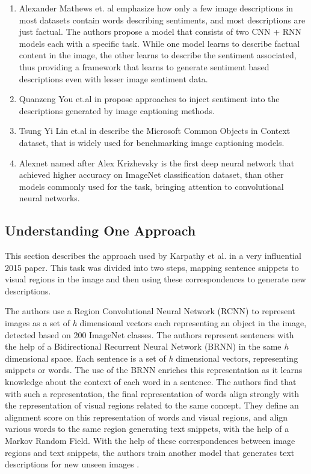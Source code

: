 \documentclass[a4paper]{article}
\begin{document}
\begin{enumerate}
\item Alexander Mathews et. al \cite{senticap-image-description} emphasize how only a few image descriptions in most datasets contain words describing sentiments, and most descriptions are just factual. The authors propose a model that consists of two CNN + RNN models each with a specific task. While one model learns to describe factual content in the image, the other learns to describe the sentiment associated, thus providing a framework that learns to generate sentiment based descriptions even with lesser image sentiment data.

\item Quanzeng You et.al in \cite{image-cap-at-will} propose approaches to inject sentiment into the descriptions generated by image captioning methods.

\item Tsung Yi Lin et.al in \cite{coco-dataset-paper} describe the Microsoft Common Objects in Context dataset, that is widely used for benchmarking image captioning models.

\item Alexnet named after Alex Krizhevsky \cite{alexnet} is the first deep neural network that achieved higher accuracy on ImageNet classification dataset, than other models commonly used for the task, bringing attention to convolutional neural networks.
\end{enumerate}

\subsection{Understanding One Approach}

This section describes the approach used by Karpathy et al. \cite{karpathy-deep-visial-semantic} in a very influential 2015 paper. This task was divided into two steps, mapping sentence snippets to visual regions in the image and then using these correspondences to generate new descriptions.

The authors use a Region Convolutional Neural Network  (RCNN) to represent images as a set of \textit{h} dimensional vectors each representing an object in the image, detected based on 200 ImageNet classes. The authors represent sentences with the help of a Bidirectional Recurrent Neural Network (BRNN) in the same \textit{h} dimensional space. Each sentence is a set of \textit{h} dimensional vectors, representing snippets or words. The use of the BRNN enriches this representation as it learns knowledge about the context of each word in a sentence. The authors find that with such a representation, the final representation of words align strongly with the representation of visual regions related to the same concept.
They define an alignment score on this representation of words and visual regions, and align various words to the same region generating text snippets, with the help of a Markov Random Field. With the help of these correspondences between image regions and text snippets, the authors train another model that generates text descriptions for new unseen images \cite{karpathy-deep-visial-semantic}.
\end{document}
